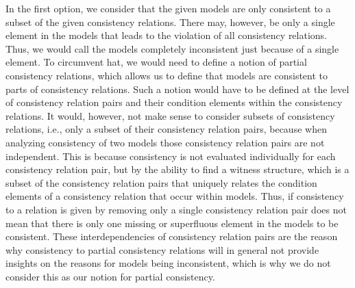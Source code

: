In the first option, we consider that the given models are only consistent to a subset of the given consistency relations.
There may, however, be only a single element in the models that leads to the violation of all consistency relations.
Thus, we would call the models completely inconsistent just because of a single element.
To circumvent hat, we would need to define a notion of partial consistency relations, which allows us to define that models are consistent to parts of consistency relations.
Such a notion would have to be defined at the level of consistency relation pairs and their condition elements within the consistency relations.
It would, however, not make sense to consider subsets of consistency relations, i.e., only a subset of their consistency relation pairs, because when analyzing consistency of two models those consistency relation pairs are not independent.
This is because consistency is not evaluated individually for each consistency relation pair, but by the ability to find a witness structure, which is a subset of the consistency relation pairs that uniquely relates the condition elements of a consistency relation that occur within models.
Thus, if consistency to a relation is given by removing only a single consistency relation pair does not mean that there is only one missing or superfluous element in the models to be consistent.
These interdependencies of consistency relation pairs are the reason why consistency to partial consistency relations will in general not provide insights on the reasons for models being inconsistent, which is why we do not consider this as our notion for partial consistency.

